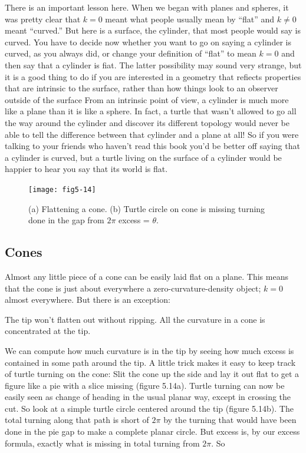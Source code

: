 \documentclass{book}
\begin{document}
There is an important lesson here. When we began with planes and
spheres, it was pretty clear that $k = 0 $ meant what people usually mean
by ``flat'' and $k \not= 0$ meant ``curved.'' But here is a surface, the cylinder,
that most people would say is curved. You have to decide now whether
you want to go on saying a cylinder is curved, as you always did, or
change your definition of ``flat'' to mean $k = 0$ and then say that a
cylinder is fiat. The latter possibility may sound very strange, but it
is a good thing to do if you are interested in a geometry that refiects
properties that are intrinsic to the surface, rather than how things look
to an observer outside of the surface From an intrinsic point of view,
a cylinder is much more like a plane than it is like a sphere. In fact,
a turtle that wasn't allowed to go all the way around the cylinder and
discover its different topology would never be able to tell the difference
between that cylinder and a plane at all! So if you were talking to your
friends who haven't read this book you'd be better off saying that a
cylinder is curved, but a turtle living on the surface of a cylinder would
be happier to hear you say that its world is flat.

\begin{figure}
\begin{center}
\texttt{[image: fig5-14]}
\caption{(a) Flattening a cone. (b) Turtle circle on cone is missing turning done in the gap from $2 \pi$ excess = $\theta$.}
\end{center}
\end{figure}

\subsection{Cones}

Almost any little piece of a cone can be easily laid flat on a plane.
This means that the cone is just about everywhere a zero-curvature-density object; $k = 0$ almost everywhere. But there is an exception:

The tip won't flatten out without ripping. All the curvature in a cone
is concentrated at the tip.

We can compute how much curvature is in the tip by seeing how much
excess is contained in some path around the tip. A little trick makes it
easy to keep track of turtle turning on the cone: Slit the cone up the side
and lay it out flat to get a figure like a pie with a slice missing (figure
5.14a). Turtle turning can now be easily seen as change of heading in
the usual planar way, except in crossing the cut. So look at a simple
turtle circle centered around the tip (figure 5.14b). The total turning
along that path is short of $2 \pi$ by the turning that would have been done
in the pie gap to make a complete planar circle. But excess is, by our
excess formula, exactly what is missing in total turning from $2 \pi$. So
\end{document}

